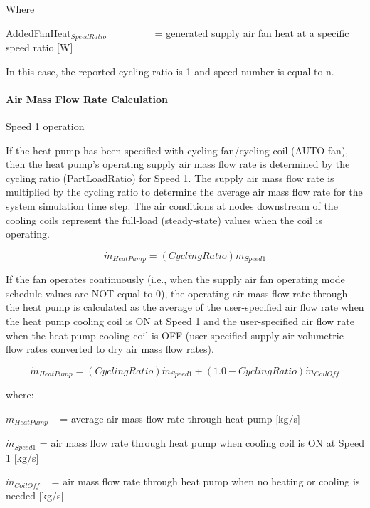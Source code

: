 Where

AddedFanHeat\(_{SpeedRatio}\)~~~~~~~~~ = generated supply air fan heat at a specific speed ratio {[}W{]}

In this case, the reported cycling ratio is 1 and speed number is equal to n.

\paragraph{Air Mass Flow Rate Calculation}\label{air-mass-flow-rate-calculation-2}

Speed 1 operation

If the heat pump has been specified with cycling fan/cycling coil (AUTO fan), then the heat pump's operating supply air mass flow rate is determined by the cycling ratio (PartLoadRatio) for Speed 1. The supply air mass flow rate is multiplied by the cycling ratio to determine the average air mass flow rate for the system simulation time step. The air conditions at nodes downstream of the cooling coils represent the full-load (steady-state) values when the coil is operating.

\begin{equation}
{\dot m_{HeatPump}} = (CyclingRatio){\dot m_{Speed1}}
\end{equation}

If the fan operates continuously (i.e., when the supply air fan operating mode schedule values are NOT equal to 0), the operating air mass flow rate through the heat pump is calculated as the average of the user-specified air flow rate when the heat pump cooling coil is ON at Speed 1 and the user-specified air flow rate when the heat pump cooling coil is OFF (user-specified supply air volumetric flow rates converted to dry air mass flow rates).

\begin{equation}
{\dot m_{HeatPump}} = (CyclingRatio){\dot m_{Speed1}} + (1.0 - CyclingRatio){\dot m_{CoilOff}}
\end{equation}

where:

\({\dot m_{HeatPump}}\) ~ = average air mass flow rate through heat pump {[}kg/s{]}

\({{{\dot m}_{Speed1}}}\) = air mass flow rate through heat pump when cooling coil is ON at Speed 1 {[}kg/s{]}

\({{{\dot m}_{CoilOff}}}\) ~ = air mass flow rate through heat pump when no heating or cooling is needed {[}kg/s{]}

